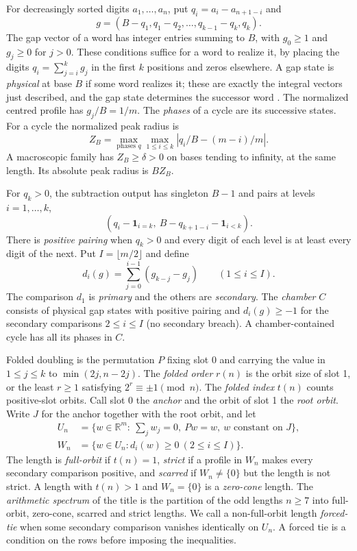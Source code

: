 \documentclass[11pt,reqno]{amsart}
\newcommand{\R}{\mathbb R}
\begin{document}
For decreasingly sorted digits \(a_1,\ldots,a_n\), put \(q_i=a_i-a_{n+1-i}\) and
\[
 g=(B-q_1,q_1-q_2,\ldots,q_{k-1}-q_k,q_k).
\]
The gap vector of a word has integer entries summing to \(B\), with \(g_0\ge1\) and \(g_j\ge0\) for \(j>0\). These conditions suffice for a word to realize it, by placing the digits \(q_i=\sum_{j=i}^k g_j\) in the first \(k\) positions and zeros elsewhere. A gap state is \emph{physical} at base \(B\) if some word realizes it; these are exactly the integral vectors just described, and the gap state determines the successor word \cite[Section~2]{G10}. The normalized centred profile has \(g_j/B=1/m\). The \emph{phases} of a cycle are its successive states. For a cycle the normalized peak radius is
\[
 Z_B=\max_{\text{phases }q}\max_{1\le i\le k}
       \left|q_i/B-(m-i)/m\right|.
\]
A macroscopic family has \(Z_B\ge\delta>0\) on bases tending to infinity, at the same length. Its absolute peak radius is \(BZ_B\).

For \(q_k>0\), the subtraction output has singleton \(B-1\) and pairs at levels \(i=1,\ldots,k\),
\[
 (q_i-\mathbf 1_{i=k},\ B-q_{k+1-i}-\mathbf 1_{i<k}).
\]
There is \emph{positive pairing} when \(q_k>0\) and every digit of each level is at least every digit of the next. Put \(I=\lfloor m/2\rfloor\) and define
\[
 d_i(g)=\sum_{j=0}^{i-1}(g_{k-j}-g_j)\qquad(1\le i\le I).
\]
The comparison \(d_1\) is \emph{primary} and the others are \emph{secondary}. The \emph{chamber} \(C\) consists of physical gap states with positive pairing and \(d_i(g)\ge-1\) for the secondary comparisons \(2\le i\le I\) (no secondary breach). A chamber-contained cycle has all its phases in \(C\).

Folded doubling is the permutation \(P\) fixing slot \(0\) and carrying the value in \(1\le j\le k\) to \(\min(2j,n-2j)\). The \emph{folded order} \(r(n)\) is the orbit size of slot 1, or the least \(r\ge1\) satisfying \(2^r\equiv\pm1\pmod n\). The \emph{folded index} \(t(n)\) counts positive-slot orbits. Call slot 0 the \emph{anchor} and the orbit of slot 1 the \emph{root orbit}. Write \(J\) for the anchor together with the root orbit, and let
\[
\begin{aligned}
 U_n&=\{w\in\R^m:\ \sum_j w_j=0,\ Pw=w,\ w\text{ constant on }J\},\\
 W_n&=\{w\in U_n:d_i(w)\ge0\ (2\le i\le I)\}.
\end{aligned}
\]
The length is \emph{full-orbit} if \(t(n)=1\), \emph{strict} if a profile in \(W_n\) makes every secondary comparison positive, and \emph{scarred} if \(W_n\ne\{0\}\) but the length is not strict. A length with \(t(n)>1\) and \(W_n=\{0\}\) is a \emph{zero-cone} length. The \emph{arithmetic spectrum} of the title is the partition of the odd lengths \(n\ge7\) into full-orbit, zero-cone, scarred and strict lengths. We call a non-full-orbit length \emph{forced-tie} when some secondary comparison vanishes identically on \(U_n\). A forced tie is a condition on the rows before imposing the inequalities.
\end{document}
